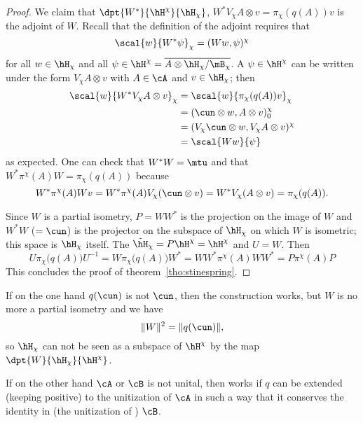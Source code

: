 \begin{proof}
We claim that $\dpt{ W^* }{ \hH^{\chi} }{ \hH_{\chi} }$, $W^*V_{\chi} A\otimes v=\pi_{\chi}(q(A))v$ is the adjoint of $W$. Recall that the definition of the adjoint requires that
\[
  \scal{ w }{ W^*\psi }_{\chi}=( Ww , \psi )^{\chi}
\]
for all $w\in\hH_{\chi}$ and all $\psi\in\hH^{\chi}=\overline{ A\otimes\hH_{\chi}/\mB_{\chi} }$. A $\psi\in\hH^{\chi}$ can be written under the form $V_{\chi}A\otimes v$ with $A\in\cA$ and $v\in\hH_{\chi}$; then
\begin{equation}
\begin{split}
\scal{ w }{ W^*V_{\chi}A\otimes v }_{\chi}&=\scal{ w }{ \pi_{\chi}(q(A))v }_{\chi}\\
        &=( \cun\otimes w , A\otimes v )_0^{\chi}\\
        &=( V_{\chi}\cun\otimes w , V_{\chi}A\otimes v )^{\chi}\\
        &=\scal{ Ww }{ \psi }
\end{split}
\end{equation}
as expected. One can check that $W^*W=\mtu$ and that $W^*\pi^{\chi}(A)W=\pi_{\chi}(q(A))$ because
\begin{equation}
  W^*\pi^{\chi}(A)Wv=W^*\pi^{\chi}(A)V_{\chi}(\cun\otimes v)
        =W^*V_{\chi}(A\otimes v)
        =\pi_{\chi}(q(A)).
\end{equation}


Since $W$ is a partial isometry, $P=WW^*$ is the projection on the image of $W$ and $W^*W$ ($=\cun$) is the projector on the subspace of $\hH_{\chi}$ on which $W$ is isometric; this space is $\hH_{\chi}$ itself. The $\tilde\hH_{\chi}=P\hH^{\chi}=\hH^{\chi}$ and $U=W$. Then
\begin{equation}
  U\pi_{\chi}\big( q(A) \big)U^{-1}=W\pi_{\chi}\big( q(A) \big)W^*
        =WW^*\pi^{\chi}(A)WW^*
        =P\pi^{\chi}(A)P
\end{equation}
This concludes the proof of theorem~\ref{tho:stinespring}.

\end{proof}


\begin{remark}
If on the one hand $q(\cun)$ is not $\cun$, then the construction works, but $W$ is no more a partial isometry and we have
\[
  \| W \|^2=\| q(\cun) \|,
\]
so $\hH_{\chi}$ can not be seen as a subspace of $\hH^{\chi}$ by the map $\dpt{W}{ \hH_{\chi} }{ \hH^{\chi} }$.

If on the other hand $\cA$ or $\cB$ is not unital, then works if $q$ can be extended (keeping positive) to the unitization of $\cA$ in such a way that it conserves the identity in (the unitization of ) $\cB$.
\end{remark}

